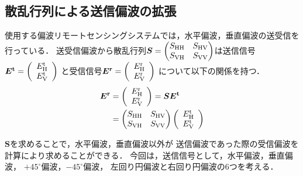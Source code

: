 \documentclass[uplatex,a4paper]{jsarticle}
\begin{document}
\subsection{散乱行列による送信偏波の拡張}
使用する偏波リモートセンシングシステムでは，水平偏波，垂直偏波の送受信を行っている．
送受信偏波から散乱行列$\bm{S} = 
\begin{pmatrix}
    S_{\rm{HH}} & S_{\rm{HV}} \\
    S_{\rm{VH}} & S_{\rm{VV}} \\
\end{pmatrix}
    $は送信信号$\bm{E^{\rm{t}}} =
\left(
    \begin{array}{c}
        E_{\rm{H}}^{\rm{t}}\\
        E_{\rm{V}}^{\rm{t}}
    \end{array}
\right)$
  と受信信号$\bm{E^{\rm{r}}} =
\left(
    \begin{array}{c}
        E_{\rm{H}}^{\rm{r}}\\
        E_{\rm{V}}^{\rm{r}}
    \end{array}
\right)$
  について以下の関係を持つ．
\begin{align}\label{equa:9}
    \bm{E^{\rm{r}}} &= 
    \left(
    \begin{array}{c}
        E_{\rm{H}}^{\rm{r}}\\
        E_{\rm{V}}^{\rm{r}}
    \end{array}
    \right)
     = \bm{S}\bm{E^{\rm{t}}} \\
     &=  
    \begin{pmatrix}
        S_{\rm{HH}} & S_{\rm{HV}} \\
        S_{\rm{VH}} & S_{\rm{VV}} \\
    \end{pmatrix}
    \left(
    \begin{array}{c}
        E_{\rm{H}}^{\rm{t}}\notag \\
        E_{\rm{V}}^{\rm{t}}
    \end{array}
    \right)
\end{align}

$\bm{S}$を求めることで，水平偏波，垂直偏波以外が
送信偏波であった際の受信偏波を計算により求めることができる．
今回は，送信信号として，水平偏波，垂直偏波，
$+45^\circ$偏波，$-45^\circ$偏波，
左回り円偏波と右回り円偏波の6つを考える．
\end{document}
